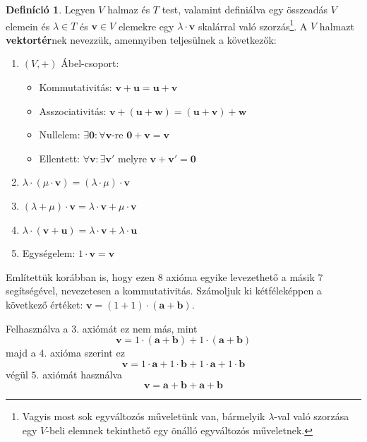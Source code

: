 \documentclass[12pt]{book}
\theoremstyle{plain} %
\theoremstyle{definition} %
\newtheorem{defi/}{Definíció}[section]
\newenvironment{defi}
  {\renewcommand{\qedsymbol}{$\clubsuit$}%
   \pushQED{\qed}\begin{defi/}}
  {\popQED\end{defi/}}
\theoremstyle{remark}
\renewcommand\qedsymbol{$\blacksquare$}
\numberwithin{equation}{section}  %
\begin{document}
	\begin{defi}
		Legyen $V$ halmaz és $T$ test, valamint definiálva egy összeadás $V$ elemein és $\lambda\in T$ és $\mathbf{v}\in V$ elemekre egy $\lambda \cdot \mathbf{v}$ skalárral való szorzás\footnote{Vagyis most sok egyváltozós műveletünk van, bármelyik $\lambda$-val való szorzása egy $V$-beli elemnek tekinthető egy önálló egyváltozós műveletnek.}. A $V$ halmazt \textbf{vektortér}nek nevezzük, amennyiben teljesülnek a következők:
		\begin{enumerate}
			\item{$(V,+)$ Ábel-csoport:
				\begin{itemize}
					\item{Kommutativitás: $\mathbf{v} + \mathbf{u} = \mathbf{u} + \mathbf{v}$}
					\item{Asszociativitás: $\mathbf{v} + (\mathbf{u} + \mathbf{w}) = (\mathbf{u} + \mathbf{v}) + \mathbf{w}$}
					\item{Nullelem: $\exists \mathbf{0}: \forall \mathbf{v}$-re $\mathbf{0} + \mathbf{v} = \mathbf{v}$}
					\item{Ellentett: $\forall \mathbf{v}: \exists \mathbf{v}'$ melyre $ \mathbf{v}+\mathbf{v}' = \mathbf{0}$ }
				\end{itemize}
			}	
			\item $\lambda \cdot (\mu \cdot \mathbf{v}) = (\lambda\cdot \mu)\cdot \mathbf{v}$
			\item $(\lambda + \mu) \cdot \mathbf{v} = \lambda\cdot \mathbf{v} + \mu \cdot \mathbf{v}$
			\item $\lambda\cdot (\mathbf{v} + \mathbf{u}) = \lambda \cdot \mathbf{v} + \lambda \cdot \mathbf{u}$
			\item Egységelem: $1\cdot \mathbf{v} = \mathbf{v}$
		\end{enumerate}
	\end{defi}

	Említettük korábban is, hogy ezen $8$ axióma egyike levezethető a másik $7$ segítségével, nevezetesen a kommutativitás. Számoljuk ki kétféleképpen a következő értéket: $\mathbf{v} = (1+1)\cdot (\mathbf{a}+\mathbf{b})$.
	
	Felhasználva a $3.$ axiómát ez nem más, mint
	\[ \mathbf{v} = 1\cdot (\mathbf{a}+\mathbf{b}) + 1\cdot (\mathbf{a}+\mathbf{b}) \]
	majd a $4.$ axióma szerint ez
	\[ \mathbf{v} = 1\cdot \mathbf{a} + 1\cdot \mathbf{b} + 1\cdot \mathbf{a} + 1\cdot \mathbf{b}  \]
	végül $5.$ axiómát használva
	\[ \mathbf{v} = \mathbf{a} + \mathbf{b} + \mathbf{a} + \mathbf{b}  \]
	
\end{document}

